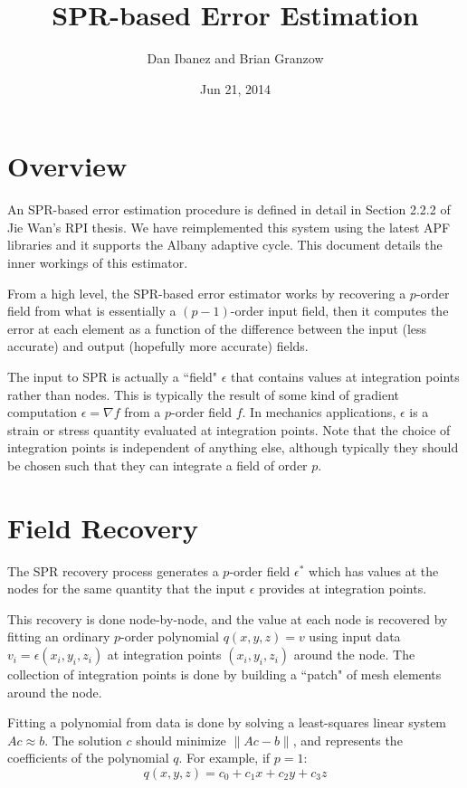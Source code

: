 \documentclass{article}
\title{SPR-based Error Estimation}
\author{Dan Ibanez and Brian Granzow}
\date{Jun 21, 2014}
\begin{document}
\maketitle

\section{Overview}
An SPR-based error estimation procedure is defined in detail
in Section 2.2.2 of Jie Wan's RPI thesis.
We have reimplemented this system using the latest APF
libraries and it supports the Albany adaptive cycle.
This document details the inner workings of this estimator.

From a high level, the SPR-based error estimator works by
recovering a $p$-order field from what is essentially
a $(p-1)$-order input field, then it computes the
error at each element as a function of the difference
between the input (less accurate) and output
(hopefully more accurate) fields. 

The input to SPR is actually a ``field" $\epsilon$ that contains values
at integration points rather than nodes.
This is typically the result of some kind of gradient computation
$\epsilon = \nabla f$ from a $p$-order field $f$.
In mechanics applications, $\epsilon$ is a strain or stress quantity
evaluated at integration points.
Note that the choice of integration points is independent of
anything else, although typically they should be chosen such
that they can integrate a field of order $p$.

\section{Field Recovery}
The SPR recovery process generates a $p$-order field $\epsilon^*$ which
has values at the nodes for the same quantity that the
input $\epsilon$ provides at integration points.

This recovery is done node-by-node, and the value at each
node is recovered by fitting an ordinary $p$-order polynomial
$q (x, y, z) = v$ using input data $v_i = \epsilon(x_i, y_i, z_i)$
at integration points $(x_i,y_i,z_i)$ around the node.
The collection of integration points is done by building
a ``patch" of mesh elements around the node.

Fitting a polynomial from data is done by solving a least-squares linear
system $Ac \approx b$.
The solution $c$ should minimize $\|Ac - b\|$, and represents
the coefficients of the polynomial $q$.
For example, if $p=1$:
\[q(x,y,z) = c_0 + c_1 x + c_2 y + c_3 z \]
\end{document}
